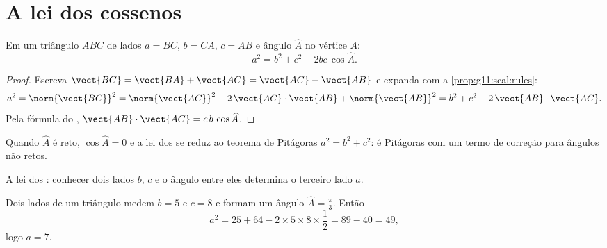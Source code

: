 \section{A lei dos cossenos}

\begin{theorem}\label{thm:g11:scal:cosines}
Em um triângulo $ABC$ de lados $a = BC$, $b = CA$, $c = AB$ e ângulo
$\widehat A$ no vértice $A$:
\[
a^2 = b^2 + c^2 - 2bc\,\cos\widehat A .
\]
\end{theorem}

\begin{proof}
Escreva $\vect{BC} = \vect{BA} + \vect{AC} = \vect{AC} - \vect{AB}$ e
expanda com a \cref{prop:g11:scal:rules}:
\[
a^2 = \norm{\vect{BC}}^2
= \norm{\vect{AC}}^2 - 2\,\vect{AC}\cdot\vect{AB} + \norm{\vect{AB}}^2
= b^2 + c^2 - 2\,\vect{AB}\cdot\vect{AC}.
\]
Pela fórmula do ,
$\vect{AB}\cdot\vect{AC} = c\,b\,\cos\widehat A$.
\end{proof}

\begin{remark}
Quando $\widehat A$ é reto, $\cos\widehat A = 0$ e a lei dos  se
reduz ao teorema de Pitágoras $a^2 = b^2 + c^2$: é Pitágoras com um termo
de correção para ângulos não retos.
\end{remark}

\begin{omfigure}

{\small A lei dos : conhecer dois lados $b$, $c$ e o ângulo entre
eles determina o terceiro lado $a$.}
\end{omfigure}

\begin{example}\label{ex:g11:scal:cosines}
Dois lados de um triângulo medem $b = 5$ e $c = 8$ e formam um ângulo
$\widehat A = \frac\pi3$. Então
\[
a^2 = 25 + 64 - 2 \times 5 \times 8 \times \frac12 = 89 - 40 = 49,
\]
logo $a = 7$.
\end{example}

